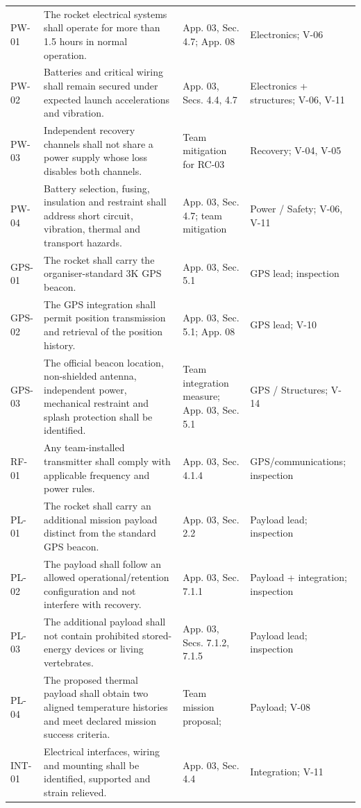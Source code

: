 \begin{longtable}{@{}L{12mm}L{71mm}L{33mm}L{34mm}@{}}
PW-01 & The rocket electrical systems shall operate for more than 1.5 hours in normal operation. & App. 03, Sec. 4.7; App. 08 & Electronics; V-06\\
PW-02 & Batteries and critical wiring shall remain secured under expected launch accelerations and vibration. & App. 03, Secs. 4.4, 4.7 & Electronics + structures; V-06, V-11\\
PW-03 & Independent recovery channels shall not share a power supply whose loss disables both channels. & Team mitigation for RC-03 & Recovery; V-04, V-05\\
PW-04 & Battery selection, fusing, insulation and restraint shall address short circuit, vibration, thermal and transport hazards. & App. 03, Sec. 4.7; team mitigation & Power / Safety; V-06, V-11\\
GPS-01 & The rocket shall carry the organiser-standard 3K GPS beacon. & App. 03, Sec. 5.1 & GPS lead; inspection\\
GPS-02 & The GPS integration shall permit position transmission and retrieval of the position history. & App. 03, Sec. 5.1; App. 08 & GPS lead; V-10\\
GPS-03 & The official beacon location, non-shielded antenna, independent power, mechanical restraint and splash protection shall be identified. & Team integration measure; App. 03, Sec. 5.1 & GPS / Structures; V-14\\
RF-01 & Any team-installed transmitter shall comply with applicable frequency and power rules. & App. 03, Sec. 4.1.4 & GPS/communications; inspection\\
PL-01 & The rocket shall carry an additional mission payload distinct from the standard GPS beacon. & App. 03, Sec. 2.2 & Payload lead; inspection\\
PL-02 & The payload shall follow an allowed operational/retention configuration and not interfere with recovery. & App. 03, Sec. 7.1.1 & Payload + integration; inspection\\
PL-03 & The additional payload shall not contain prohibited stored-energy devices or living vertebrates. & App. 03, Secs. 7.1.2, 7.1.5 & Payload lead; inspection\\
PL-04 & The proposed thermal payload shall obtain two aligned temperature histories and meet declared mission success criteria. & Team mission proposal; \cite{rtc2027app07} & Payload; V-08\\
INT-01 & Electrical interfaces, wiring and mounting shall be identified, supported and strain relieved. & App. 03, Sec. 4.4 & Integration; V-11\\

\end{longtable}
